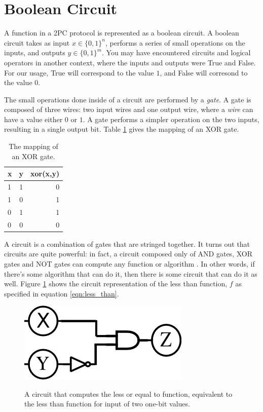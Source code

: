 \section{Boolean Circuit} 
A function in a 2PC protocol is represented as a boolean circuit.
A boolean circuit takes as input $x \in \{0,1\}^n$, performs a series of small operations on the inputs, and outputs $y \in \{0,1\}^m$.  
You may have encountered circuits and logical operators in another context, where the inputs and outputs were True and False.
For our usage, True will correspond to the value $1$, and False will corresond to the value $0$. 

The small operations done inside of a circuit are performed by a \emph{gate}.
A gate is composed of three wires: two input wires and one output wire, where a \emph{wire} can have a value either $0$ or $1$.
A gate performs a simpler operation on the two inputs, resulting in a single output bit.
Table \ref{tab:xor} gives the mapping of an XOR gate.

\begin{table}[h]
\label{tab:xor}
\centering
\begin{tabular}{ | l | c || r |}
\hline
x & y & xor(x,y) \\ \hline
1 & 1 & 0 \\ \hline
1 & 0 & 1 \\ \hline
0 & 1 & 1 \\ \hline
0 & 0 & 0 \\ \hline
\end{tabular}
\caption{The mapping of an XOR gate.}
\end{table}

A circuit is a combination of gates that are stringed together.
It turns out that circuits are quite powerful: in fact, a circuit composed only of AND gates, XOR gates and NOT gates can compute any function or algorithm \cite{Goldreich}.
In other words, if there's some algorithm that can do it, then there is some circuit that can do it as well.
Figure \ref{fig:less_than_circuit} shows the circuit representation of the less than function, $f$ as specified in equation \ref{eqn:less_than}.

\begin{figure}[h]
    \centering
    \includegraphics[scale=0.75]{images/drawing.png}
    \label{fig:less_than_circuit}
    \caption{A circuit that computes the less or equal to function, equivalent to the less than function for input of two one-bit values.}
\end{figure}

